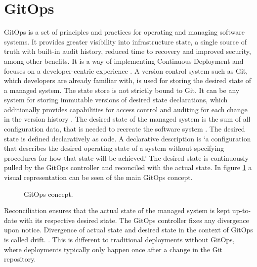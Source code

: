 \section{GitOps}
\label{theoretical-background:gitops}

GitOps is a set of principles and practices for operating and managing software systems.
It provides greater visibility into infrastructure state,
a single source of truth with built-in audit history,
reduced time to recovery and improved security,
among other benefits.
It is a way of implementing Continuous Deployment
and focuses on a developer-centric experience \autocite{gitopsCloudnativeCDInnoq}.
A version control system such as Git, which developers are already familiar with,
is used for storing the desired state of a managed system.
The state store is not strictly bound to Git.
It can be any system for storing immutable versions of desired state declarations,
which additionally provides capabilities for access control and auditing for each change
in the version history
\autocite{gitopsGlossary}.
The desired state of the managed system is
the sum of all configuration data, that is needed
to recreate the software system \autocite{gitopsGlossary}.
The desired state is defined declaratively as code.
A declarative description is
\enquote*{a configuration that describes the desired operating state of a system without specifying procedures for how that state will be achieved.}
\autocite{gitopsGlossary}
The desired state is continuously pulled by the GitOps controller and reconciled with the actual state.
In figure \ref{fig:gitOpsConcept} a visual representation can be seen of the main GitOps concept.

\begin{figure}[h]
	\centering
	\caption{GitOps concept.
	}
	\label{fig:gitOpsConcept}	
\end{figure}

Reconciliation ensures that the actual state of the managed system is kept up-to-date
with its respective desired state. The GitOps controller fixes any divergence upon notice.
Divergence of actual state and desired state in the context of GitOps is called drift.
\autocite{gitopsGlossary}.
This is different to traditional deployments without GitOps,
where deployments typically only happen once after a change in the Git repository.


